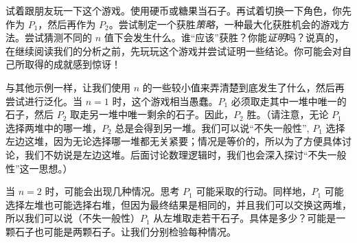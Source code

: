 试着跟朋友玩一下这个游戏。使用硬币或糖果当石子。再试着切换一下角色，你先作为 $P_1$，然后再作为 $P_2$。尝试制定一个获胜\emph{策略}，一种最大化获胜机会的游戏方法。尝试猜测不同的 $n$ 值下会发生什么。谁``应该''获胜？你能\emph{证明}吗？说真的，在继续阅读我们的分析之前，先玩玩这个游戏并尝试证明一些结论。你可能会对自己所取得的成就感到惊讶！

与其他示例一样，让我们使用 $n$ 的一些较小值来弄清楚到底发生了什么，然后再尝试进行泛化。当 $n = 1$ 时，这个游戏相当愚蠢。$P_1$ 必须取走其中一堆中唯一的石子，然后 $P_2$ 取走另一堆中唯一剩余的石子。因此，$P_2$ 胜。（请注意，无论 $P_1$ 选择两堆中的哪一堆，$P_2$ 总是会得到另一堆。我们可以说``不失一般性'', $P_1$ 选择左边这堆，因为无论选择哪一堆都无关紧要；情况是等价的，所以为了方便具体讨论，我们不妨说是左边这堆。后面讨论数理逻辑时，我们也会深入探讨``不失一般性''这一思想。）


\begin{center}
\end{center}

当 $n = 2$ 时，可能会出现几种情况。思考 $P_1$ 可能采取的行动。同样地，$P_1$ 可能选择左堆也可能选择右堆，但因为最终结果是相同的，并且我们可以交换这两堆，所以我们可以说（不失一般性）$P_1$ 从左堆取走若干石子。具体是多少？可能是一颗石子也可能是两颗石子。让我们分别检验每种情况。


